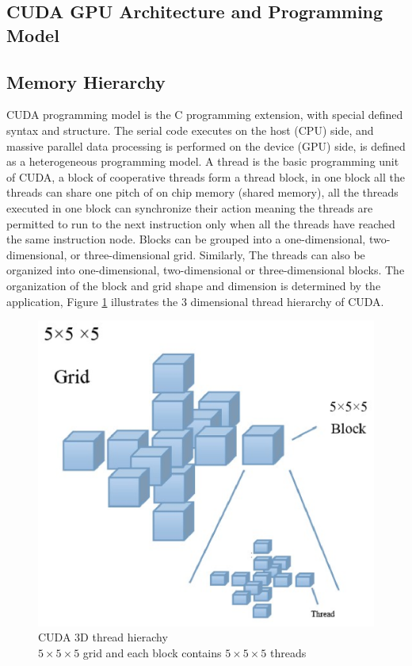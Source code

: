 \documentclass[12pt,a4paper,final]{article}
\begin{document}
\begin{spacing}{2.5}
\section{CUDA GPU Architecture and  Programming Model} \label{programming model}
\subsection{Memory Hierarchy}  
CUDA programming model is the C programming extension, with special defined syntax and structure. The serial code executes on the host (CPU) side, and massive parallel data processing is performed on the device (GPU) side, is defined as a heterogeneous programming model. A thread is the basic programming unit of CUDA, a block of cooperative threads form a thread block, in one block all the threads can share one pitch of on chip memory (shared memory), all the threads executed in one block can synchronize their action meaning the threads are permitted to run to the next instruction only when all the threads have reached the same instruction node. Blocks can be grouped into a one-dimensional, two-dimensional, or three-dimensional grid. Similarly, The threads can also be organized into one-dimensional, two-dimensional or three-dimensional blocks. The organization of the block and grid shape and dimension is determined by the application, Figure \ref{figure1} illustrates the 3 dimensional thread hierarchy of CUDA.
\begin{figure}[htb]
\centering
\includegraphics[scale=0.5]{CUDA_programming_hierachy.eps}
\caption{CUDA 3D thread hierachy\\ $5\times 5\times 5$ grid and each block contains $5\times 5\times 5$ threads\\}
\label{figure1}
\end{figure}


\end{spacing}
\end{document}
